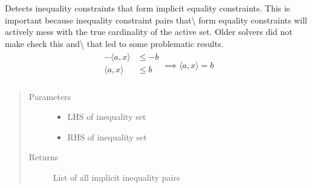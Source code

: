 \documentclass[letterpaper,10pt,english]{sphinxmanual}
\begin{document}

\begin{fulllineitems}
\label{\detokenize{ppopt.utils:ppopt.utils.constraint_utilities.detect_implicit_equalities}}
\sphinxAtStartPar
Detects inequality constraints that form implicit equality constraints. This is important because inequality constraint pairs that\textbackslash{}
form equality constraints will actively mess with the true cardinality of the active set. Older solvers did not make check this and\textbackslash{}
that led to some problematic results.
\begin{equation*}
\begin{split}\begin{align*}
-\langle a, x \rangle &\leq -b\\
\langle a, x \rangle &\leq b\\
\end{align*} \implies \langle a, x \rangle = b\end{split}
\end{equation*}\begin{quote}\begin{description}
\item[{Parameters}] \leavevmode\begin{itemize}
\item {} 
\sphinxAtStartPar
{} \textendash{} LHS of inequality set

\item {} 
\sphinxAtStartPar
{} \textendash{} RHS of inequality set

\end{itemize}

\item[{Returns}] \leavevmode
\sphinxAtStartPar
List of all implicit inequality pairs

\end{description}\end{quote}

\end{fulllineitems}
\end{document}
